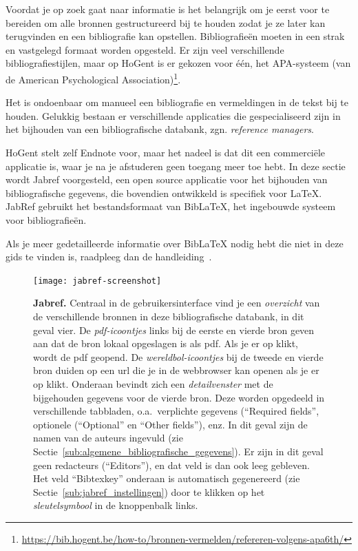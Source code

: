 Voordat je op zoek gaat naar informatie is het belangrijk om je eerst voor te bereiden om alle bronnen gestructureerd bij te houden zodat je ze later kan terugvinden en een bibliografie kan opstellen. Bibliografieën moeten in een strak en vastgelegd formaat worden opgesteld. Er zijn veel verschillende bibliografiestijlen, maar op HoGent is er gekozen voor één, het APA-systeem (van de American Psychological Association)\footnote{\url{https://bib.hogent.be/how-to/bronnen-vermelden/refereren-volgens-apa6th/}}.

Het is ondoenbaar om manueel een bibliografie en vermeldingen in de tekst bij te houden.  Gelukkig bestaan er verschillende applicaties die gespecialiseerd zijn in het bijhouden van een bibliografische databank, zgn. \emph{reference managers}.

HoGent stelt zelf Endnote voor, maar het nadeel is dat dit een commerciële applicatie is, waar je na je afstuderen geen toegang meer toe hebt. In deze sectie wordt Jabref voorgesteld, een open source applicatie voor het bijhouden van bibliografische gegevens, die bovendien ontwikkeld is specifiek voor {\LaTeX}. JabRef gebruikt het bestandsformaat van Bib{\LaTeX}, het ingebouwde systeem voor bibliografieën.

Als je meer gedetailleerde informatie over Bib{\LaTeX} nodig hebt die niet in deze gids te vinden is, raadpleeg dan de handleiding~\autocite{LehmanEtAl2016}.

\begin{figure}
  \centering
  \texttt{[image: jabref-screenshot]}
  \caption[Jabref]{\textbf{Jabref.} Centraal in de gebruikersinterface vind je een \emph{overzicht} van de verschillende bronnen in deze bibliografische databank, in dit geval vier. De \emph{pdf-icoontjes} links bij de eerste en vierde bron geven aan dat de bron lokaal opgeslagen is als pdf. Als je er op klikt, wordt de pdf geopend. De \emph{wereldbol-icoontjes} bij de tweede en vierde bron duiden op een url die je in de webbrowser kan openen als je er op klikt. Onderaan bevindt zich een \emph{detailvenster} met de bijgehouden gegevens voor de vierde bron. Deze worden opgedeeld in verschillende tabbladen, o.a.~verplichte gegevens (``Required fields'', optionele (``Optional'' en ``Other fields''), enz. In dit geval zijn de namen van de auteurs ingevuld (zie Sectie~\ref{sub:algemene_bibliografische_gegevens}). Er zijn in dit geval geen redacteurs (``Editors''), en dat veld is dan ook leeg gebleven. Het veld ``Bibtexkey'' onderaan is automatisch gegenereerd (zie Sectie~\ref{sub:jabref_instellingen}) door te klikken op het \emph{sleutelsymbool} in de knoppenbalk links.}
  \label{fig:jabref}
\end{figure}

